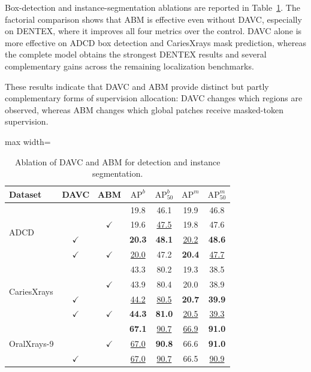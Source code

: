 \documentclass[conference]{IEEEtran}
\newcommand{\DAVC}{\textsc{DAVC}}
\newcommand{\ABM}{\textsc{ABM}}
\newcommand{\cmark}{\ensuremath{\checkmark}}
\newcommand{\APb}{\ensuremath{\mathrm{AP}^{b}}}
\newcommand{\APm}{\ensuremath{\mathrm{AP}^{m}}}
\newcommand{\APbFifty}{\ensuremath{\mathrm{AP}^{b}_{50}}}
\newcommand{\APmFifty}{\ensuremath{\mathrm{AP}^{m}_{50}}}
\newcommand{\dataset}[1]{\textsc{#1}}
\newcommand{\best}[1]{\textbf{#1}}
\newcommand{\second}[1]{\underline{#1}}
\begin{document}
Box-detection and instance-segmentation ablations are reported in Table~\ref{tab:detection-ablation}. The factorial comparison shows that \ABM{} is effective even without \DAVC{}, especially on \dataset{DENTEX}, where it improves all four metrics over the control. \DAVC{} alone is more effective on ADCD box detection and CariesXrays mask prediction, whereas the complete model obtains the strongest DENTEX results and several complementary gains across the remaining localization benchmarks.

These results indicate that \DAVC{} and \ABM{} provide distinct but partly complementary forms of supervision allocation: \DAVC{} changes which regions are observed, whereas \ABM{} changes which global patches receive masked-token supervision.

\begin{table}[!t]
  \centering
  \scriptsize
  \setlength{\tabcolsep}{2.7pt}
  \renewcommand{\arraystretch}{1.04}
  \caption{Ablation of \DAVC{} and \ABM{} for detection and instance segmentation.}
  \label{tab:detection-ablation}
  \begin{adjustbox}{max width=\columnwidth}
  \begin{tabular}{lcc*{4}{c}}
    \toprule
    \textbf{Dataset} & \DAVC{} & \ABM{}
    & \APb{} & \APbFifty{} & \APm{} & \APmFifty{} \\
    \midrule
    \multirow{4}{*}{ADCD}
    &  &  & 19.8 & 46.1 & 19.9 & 46.8 \\
    &  & \cmark & 19.6 & \second{47.5} & 19.8 & 47.6 \\
    & \cmark &  & \best{20.3} & \best{48.1} & \second{20.2} & \best{48.6} \\
    & \cmark & \cmark & \second{20.0} & 47.2 & \best{20.4} & \second{47.7} \\
    \midrule
    \multirow{4}{*}{CariesXrays}
    &  &  & 43.3 & 80.2 & 19.3 & 38.5 \\
    &  & \cmark & 43.9 & 80.4 & 20.0 & 38.9 \\
    & \cmark &  & \second{44.2} & \second{80.5} & \best{20.7} & \best{39.9} \\
    & \cmark & \cmark & \best{44.3} & \best{81.0} & \second{20.5} & \second{39.3} \\
    \midrule
    \multirow{4}{*}{OralXrays-9}
    &  &  & \best{67.1} & \second{90.7} & \second{66.9} & \best{91.0} \\
    &  & \cmark & \second{67.0} & \best{90.8} & 66.6 & \best{91.0} \\
    & \cmark &  & \second{67.0} & \second{90.7} & 66.5 & \second{90.9} \\

\end{tabular}
\end{adjustbox}
\end{table}
\end{document}
